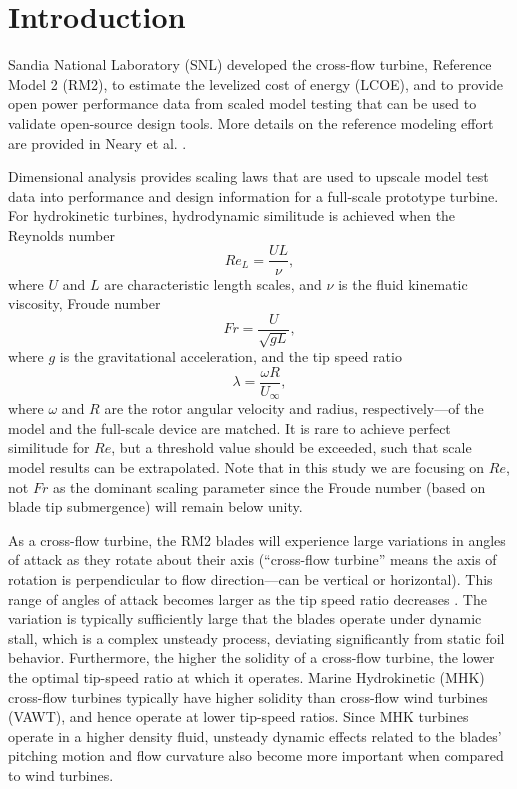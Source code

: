 \documentclass[12pt,letterpaper]{scrreprt}
\begin{document}
\tableofcontents

\newpage
\listoftodos

\chapter{Introduction}

Sandia National Laboratory (SNL) developed the cross-flow turbine, Reference
Model 2 (RM2), to estimate the levelized cost of energy (LCOE), and to provide
open power performance data from scaled model testing that can be used to
validate open-source design tools.  More details on the reference modeling
effort are provided in Neary et al. \cite{Neary2014}.

Dimensional analysis provides scaling laws that are used to upscale model test
data into performance and design information for a full-scale prototype turbine.
For hydrokinetic turbines, hydrodynamic similitude is achieved when the Reynolds
number
\begin{equation}
Re_L = \frac{UL}{\nu},
\label{eq-Re}
\end{equation}
where $U$ and $L$ are characteristic length scales, and $\nu$ is the fluid
kinematic viscosity, Froude number
\begin{equation}
Fr = \frac{U}{\sqrt{gL}},
\label{eq-Fr}
\end{equation}
where $g$ is the gravitational acceleration, and the tip speed ratio
\begin{equation}
\lambda=\frac{\omega R}{U_\infty},
\end{equation}
where $\omega$ and $R$ are the rotor angular velocity and radius,
respectively---of the model and the full-scale device are matched. It is rare to
achieve perfect similitude for $Re$, but a threshold value should be exceeded,
such that scale model results can be extrapolated. Note that in this study we
are focusing on $Re$, not $Fr$ as the dominant scaling parameter since the
Froude number (based on blade tip submergence) will remain below unity.

As a cross-flow turbine, the RM2 blades will experience large variations in
angles of attack as they rotate about their axis (``cross-flow turbine'' means
the axis of rotation is perpendicular to flow direction---can be vertical or
horizontal). This range of angles of attack becomes larger as the tip speed
ratio decreases \cite{Para2002}. The variation is typically sufficiently large
that the blades operate under dynamic stall, which is a complex unsteady
process, deviating significantly from static foil behavior. Furthermore, the
higher the solidity of a cross-flow turbine, the lower the optimal tip-speed
ratio at which it operates. Marine Hydrokinetic (MHK) cross-flow turbines
typically have higher solidity than cross-flow wind turbines (VAWT), and hence
operate at lower tip-speed ratios. Since MHK turbines operate in a higher
density fluid, unsteady dynamic effects related to the blades' pitching motion
and flow curvature also become more important when compared to wind turbines.
\end{document}
